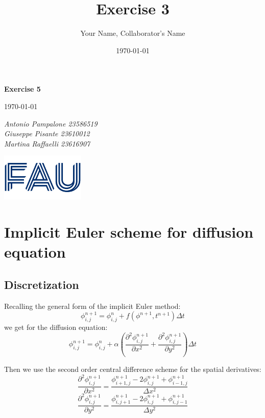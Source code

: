 \documentclass{article}
\title{Exercise 3}
\author{Your Name, Collaborator's Name}
\date{\today}
\begin{document}
\begin{titlepage}
    \centering
    \vspace*{1in}
    
    {\Huge\bfseries Exercise 5\par}
    \vspace{1.5cm}
    {\Large \today\par}
    \vspace{1.5cm}
    {\Large\itshape Antonio Pampalone 23586519 \\ Giuseppe Pisante 23610012\\ Martina Raffaelli 23616907 \par}
    
    \vfill
    \includegraphics[width=0.3\textwidth]{FAU-Logo.png}\par\vspace{1cm} %
   
\end{titlepage}

\newpage
\small

\section{Implicit Euler scheme for diffusion equation}
\subsection{Discretization}
Recalling the general form of the implicit Euler method:
\begin{equation*}
  \phi^{n+1}_{i,j} = \phi^{n}_{i,j} + f(\phi^{n+1}, t^{n+1}) \Delta t 
\end{equation*}
we get for the diffusion equation:
\begin{equation*}
  \phi^{n+1}_{i,j} = \phi^{n}_{i,j} + \alpha (\frac{\partial^2 \phi^{n+1}_{i,j}}{\partial x^2} + \frac{\partial^2 \phi^{n+1}_{i,j}}{\partial y^2}) \Delta t
\end{equation*}

Then we use the second order central difference scheme for the spatial derivatives:
\begin{equation*}
  \frac{\partial^2 \phi^{n+1}_{i,j}}{\partial x^2} = \frac{\phi^{n+1}_{i+1,j} - 2\phi^{n+1}_{i,j} + \phi^{n+1}_{i-1,j}}{\Delta x^2}
\end{equation*}
\begin{equation*}
  \frac{\partial^2 \phi^{n+1}_{i,j}}{\partial y^2} = \frac{\phi^{n+1}_{i,j+1} - 2\phi^{n+1}_{i,j} + \phi^{n+1}_{i,j-1}}{\Delta y^2}
\end{equation*}
\end{document}
